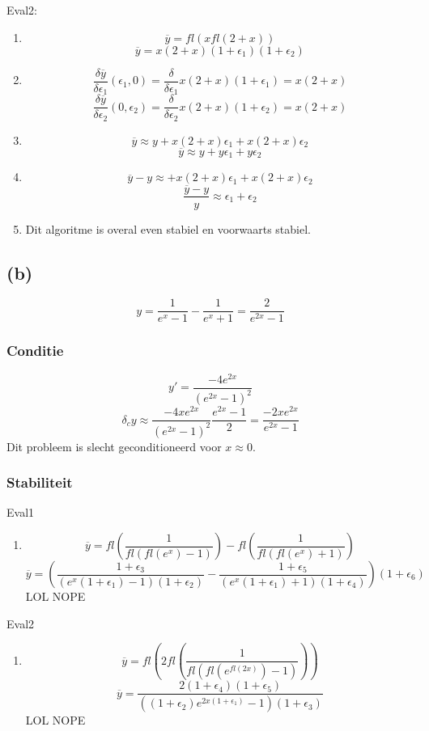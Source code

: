\documentclass[12pt,a4paper]{article}
\begin{document}
Eval2:
\begin{enumerate}
\item
\[
\overline{y} = fl(xfl(2+x))
\]
\[
\overline{y} = x(2+x)(1+\epsilon_1)(1+\epsilon_2)
\]

\item
\[
\frac{\delta\overline{y}}{\delta\epsilon_1}(\epsilon_1,0)
= \frac{\delta}{\delta\epsilon_1} x(2+x)(1+\epsilon_1)
= x(2+x)
\]
\[
\frac{\delta\overline{y}}{\delta\epsilon_2}(0,\epsilon_2)
= \frac{\delta}{\delta\epsilon_2} x(2+x)(1+\epsilon_2)
= x(2+x)
\]

\item
\[
\overline{y} \approx y
+ x(2+x)\epsilon_1
+ x(2+x)\epsilon_2
\]
\[
\overline{y} \approx y
+ y\epsilon_1
+ y\epsilon_2
\]
\item
\[
\overline{y} -y \approx
+ x(2+x)\epsilon_1
+ x(2+x)\epsilon_2
\]
\[
\frac{\overline{y}-y}{y} \approx
\epsilon_1 + \epsilon_2
\]
\item
Dit algoritme is overal even stabiel en voorwaarts stabiel.
\end{enumerate}

\subsection{(b)}
\[
y = \frac{1}{e^x-1}-\frac{1}{e^x+1} = \frac{2}{e^{2x}-1}
\]

\subsubsection{Conditie}
\[
y' = \frac{-4e^{2x}}{(e^{2x}-1)^2}
\]
\[
\delta_cy \approx \frac{-4xe^{2x}}{(e^{2x}-1)^2}\frac{e^{2x}-1}{2}
= \frac{-2xe^{2x}}{e^{2x}-1}
\]
Dit probleem is slecht geconditioneerd voor $x\approx 0$.

\subsubsection{Stabiliteit}
Eval1
\begin{enumerate}
\item
\[
\overline{y} = fl\left(\frac{1}{fl(fl(e^x)-1)}\right) - fl\left(\frac{1}{fl(fl(e^x)+1)}\right)
\]
\[
\overline{y} 
=
\left(
\frac{1+\epsilon_3}{(e^x(1+\epsilon_1) - 1)(1+\epsilon_2)}
- \frac{1+\epsilon_5}{(e^x(1+\epsilon_1) + 1)(1+\epsilon_4)}
\right)
(1+\epsilon_6)
\]
LOL NOPE
\end{enumerate}

\noindent Eval2
\begin{enumerate}
\item
\[
\overline{y} = fl\left(2fl\left(\frac{1}{fl\left(fl\left(e^{fl(2x)}\right)-1\right)}\right)\right)
\]
\[
\overline{y} = \frac{2(1+\epsilon_4)(1+\epsilon_5)}{\left((1+\epsilon_2)e^{2x(1+\epsilon_1)} -1\right)(1+\epsilon_3)}
\]
LOL NOPE
\end{enumerate}
\end{document}
